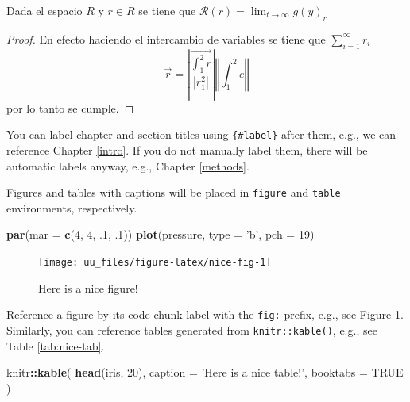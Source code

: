 \documentclass[12pt,]{book}
\newenvironment{Shaded}{\begin{snugshade}}{\end{snugshade}}
\newcommand{\DataTypeTok}[1]{\textcolor[rgb]{0.13,0.29,0.53}{#1}}
\newcommand{\DecValTok}[1]{\textcolor[rgb]{0.00,0.00,0.81}{#1}}
\newcommand{\FloatTok}[1]{\textcolor[rgb]{0.00,0.00,0.81}{#1}}
\newcommand{\KeywordTok}[1]{\textcolor[rgb]{0.13,0.29,0.53}{\textbf{#1}}}
\newcommand{\NormalTok}[1]{#1}
\newcommand{\OperatorTok}[1]{\textcolor[rgb]{0.81,0.36,0.00}{\textbf{#1}}}
\newcommand{\OtherTok}[1]{\textcolor[rgb]{0.56,0.35,0.01}{#1}}
\newcommand{\StringTok}[1]{\textcolor[rgb]{0.31,0.60,0.02}{#1}}
\theoremstyle{definition}
\theoremstyle{definition}
\theoremstyle{definition}
\theoremstyle{remark}
\let\BeginKnitrBlock\begin \let\EndKnitrBlock\end
\begin{document}
\BeginKnitrBlock{theorem}[russ]
\protect\hypertarget{thm:www}{}{\label{thm:www} {} }Dada el espacio \(R\) y \(r\in R\) se tiene que \(\mathcal{R}(r)=\lim_{t\to\infty}g(y)_r\)
\EndKnitrBlock{theorem}

\BeginKnitrBlock{proof}
{}En efecto haciendo el intercambio de variables se tiene que \(\sum_{i=1}^{\infty}r_i\)
\[\vec{r}=\left\vert\frac{\vec{\int_1^2r}}{\left|r_1^2\right|}\right\vert\left\Vert\int_1^2e\right\Vert\]
por lo tanto se cumple.
\EndKnitrBlock{proof}

You can label chapter and section titles using \texttt{\{\#label\}} after them, e.g., we can reference Chapter \ref{intro}. If you do not manually label them, there will be automatic labels anyway, e.g., Chapter \ref{methods}.

Figures and tables with captions will be placed in \texttt{figure} and \texttt{table} environments, respectively.

\begin{Shaded}
\begin{Highlighting}[]
\KeywordTok{par}\NormalTok{(}\DataTypeTok{mar =} \KeywordTok{c}\NormalTok{(}\DecValTok{4}\NormalTok{, }\DecValTok{4}\NormalTok{, }\FloatTok{.1}\NormalTok{, }\FloatTok{.1}\NormalTok{))}
\KeywordTok{plot}\NormalTok{(pressure, }\DataTypeTok{type =} \StringTok{'b'}\NormalTok{, }\DataTypeTok{pch =} \DecValTok{19}\NormalTok{)}
\end{Highlighting}
\end{Shaded}

\begin{figure}

{\centering \texttt{[image: uu\_files/figure-latex/nice-fig-1]} 

}

\caption{Here is a nice figure!}\label{fig:nice-fig}
\end{figure}

Reference a figure by its code chunk label with the \texttt{fig:} prefix, e.g., see Figure \ref{fig:nice-fig}. Similarly, you can reference tables generated from \texttt{knitr::kable()}, e.g., see Table \ref{tab:nice-tab}.

\begin{Shaded}
\begin{Highlighting}[]
\NormalTok{knitr}\OperatorTok{::}\KeywordTok{kable}\NormalTok{(}
  \KeywordTok{head}\NormalTok{(iris, }\DecValTok{20}\NormalTok{), }\DataTypeTok{caption =} \StringTok{'Here is a nice table!'}\NormalTok{,}
  \DataTypeTok{booktabs =} \OtherTok{TRUE}
\NormalTok{)}
\end{Highlighting}
\end{Shaded}
\end{document}
